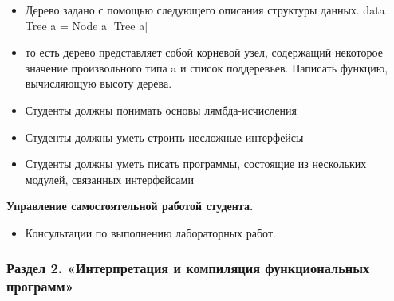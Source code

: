 {\begin{description}
\begin{itemize}
\item Дерево задано с помощью следующего описания структуры данных. data Tree a = Node a [Tree a]\item то есть дерево представляет собой корневой узел, содержащий некоторое значение произвольного типа a и список поддеревьев. Написать функцию, вычисляющую высоту дерева.\item Студенты должны понимать основы лямбда-исчисления\item Студенты должны уметь строить несложные интерфейсы\item Студенты должны уметь писать программы, состоящие из нескольких модулей, связанных интерфейсами
\end{itemize}
\end{description}

\textbf{Управление самостоятельной работой студента.}
\begin{itemize}
\item Консультации по выполнению лабораторных работ.
\end{itemize}
}


\subsubsection{Раздел 2. «Интерпретация и компиляция функциональных программ»}

